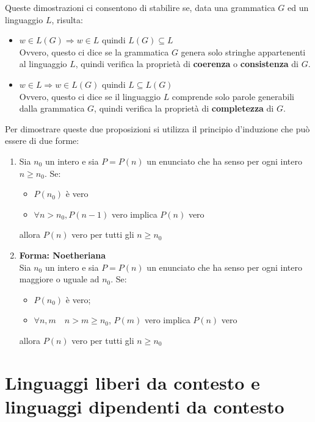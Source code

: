 \documentclass[12pt]{report}
\begin{document}
	Queste dimostrazioni ci consentono di stabilire se, data una grammatica $G$ ed un linguaggio $L$, risulta:
	\begin{itemize}
		\item $w \in L(G) \Rightarrow w \in L$ quindi $L(G) \subseteq L$ \\
		Ovvero, questo ci dice se la grammatica $G$ genera solo stringhe appartenenti al linguaggio $L$, quindi verifica la proprietà di \textbf{coerenza} o \textbf{consistenza} di $G$.
		\item $w \in L \Rightarrow w \in L(G)$ quindi $L \subseteq L(G)$ \\
		Ovvero, questo ci dice se il linguaggio $L$ comprende solo parole generabili dalla grammatica $G$, quindi verifica la proprietà di \textbf{completezza} di $G$.
	\end{itemize}
	Per dimostrare queste due proposizioni si utilizza il principio d'induzione che può essere di due forme:
	\begin{enumerate}
		\item Sia $n_0$ un intero e sia $P = P(n)$ un enunciato che ha senso per ogni intero $n \geq n_0$. Se:
		\begin{itemize}
			\item $P(n_0)$ è vero
			\item $\forall n > n_0, P(n-1)$ vero implica $P(n)$ vero
		\end{itemize}
		allora $P(n)$ vero per tutti gli $n \geq n_0$
		\item \textbf{Forma: Noetheriana} \\
		Sia $n_0$ un intero e sia $P=P(n)$ un enunciato che ha senso per ogni intero maggiore o uguale ad $n_0$. Se:
		\begin{itemize}
			\item $P(n_0)$ è vero;
			\item $\forall n, m \quad n>m\geq n_0$, $P(m)$ vero implica $P(n)$ vero
		\end{itemize}
		allora $P(n)$ vero per tutti gli $n \geq n_0$
	\end{enumerate}
	\chapter{Linguaggi liberi da contesto e linguaggi dipendenti da contesto}
\end{document}
